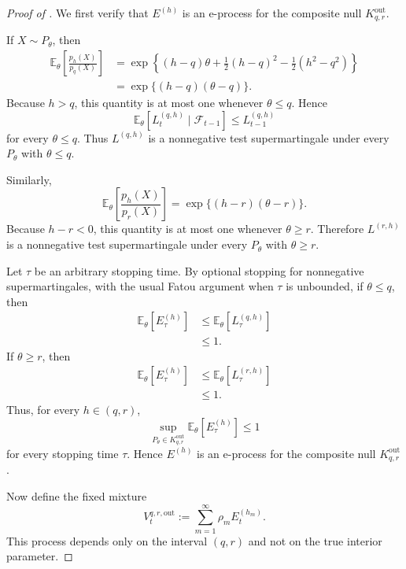 \documentclass[12pt]{article}
\theoremstyle{spaced}
\theoremstyle{remark}
\begin{document}
\begin{proof}[Proof of ]
We first verify that $E^{(h)}$ is an e-process for the
composite null $K_{q,r}^{\mathrm{out}}$.

If $X\sim P_\theta$, then
\begin{align*}
    \mathbb E_\theta
    \left[
        \frac{p_h(X)}{p_q(X)}
    \right]
    &=
    \exp\left\{
        (h-q)\theta
        +
        \frac12(h-q)^2
        -
        \frac12(h^2-q^2)
    \right\}\\
    &=
    \exp\{(h-q)(\theta-q)\}.
\end{align*}
Because $h>q$, this quantity is at most one whenever
$\theta\le q$. Hence
\[
    \mathbb E_\theta
    \left[
        L_t^{(q,h)}
        \mid
        \mathcal F_{t-1}
    \right]
    \le
    L_{t-1}^{(q,h)}
\]
for every $\theta\le q$. Thus $L^{(q,h)}$ is a nonnegative test
supermartingale under every $P_\theta$ with $\theta\le q$.

Similarly,
\[
    \mathbb E_\theta
    \left[
        \frac{p_h(X)}{p_r(X)}
    \right]
    =
    \exp\{(h-r)(\theta-r)\}.
\]
Because $h-r<0$, this quantity is at most one whenever
$\theta\ge r$. Therefore $L^{(r,h)}$ is a nonnegative test
supermartingale under every $P_\theta$ with $\theta\ge r$.

Let $\tau$ be an arbitrary stopping time. By optional stopping
for nonnegative supermartingales, with the usual Fatou argument
when $\tau$ is unbounded, if $\theta\le q$, then
\[
\begin{aligned}
    \mathbb E_\theta
    \left[
        E_\tau^{(h)}
    \right]
    &\le
    \mathbb E_\theta
    \left[
        L_\tau^{(q,h)}
    \right]\\
    &\le1.
\end{aligned}
\]
If $\theta\ge r$, then
\[
\begin{aligned}
    \mathbb E_\theta
    \left[
        E_\tau^{(h)}
    \right]
    &\le
    \mathbb E_\theta
    \left[
        L_\tau^{(r,h)}
    \right]\\
    &\le1.
\end{aligned}
\]
Thus, for every $h\in(q,r)$,
\[
    \sup_{P_\theta\in K_{q,r}^{\mathrm{out}}}
    \mathbb E_\theta
    \left[
        E_\tau^{(h)}
    \right]
    \le1
\]
for every stopping time $\tau$. Hence $E^{(h)}$ is an e-process
for the composite null $K_{q,r}^{\mathrm{out}}$.

Now define the fixed mixture
\begin{equation}
\label{eq:gaussian-universal-mixture}
    V_t^{q,r,\mathrm{out}}
    :=
    \sum_{m=1}^\infty
    \rho_m E_t^{(h_m)}.
\end{equation}
This process depends only on the interval $(q,r)$ and not on the
true interior parameter.


\end{proof}
\end{document}
